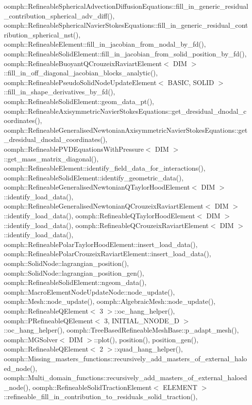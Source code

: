 oomph\+::\+Refineable\+Spherical\+Advection\+Diffusion\+Equations\+::fill\+\_\+in\+\_\+generic\+\_\+residual\+\_\+contribution\+\_\+spherical\+\_\+adv\+\_\+diff(), oomph\+::\+Refineable\+Spherical\+Navier\+Stokes\+Equations\+::fill\+\_\+in\+\_\+generic\+\_\+residual\+\_\+contribution\+\_\+spherical\+\_\+nst(), oomph\+::\+Refineable\+Element\+::fill\+\_\+in\+\_\+jacobian\+\_\+from\+\_\+nodal\+\_\+by\+\_\+fd(), oomph\+::\+Refineable\+Solid\+Element\+::fill\+\_\+in\+\_\+jacobian\+\_\+from\+\_\+solid\+\_\+position\+\_\+by\+\_\+fd(), oomph\+::\+Refineable\+Buoyant\+Q\+Crouzeix\+Raviart\+Element$<$ D\+I\+M $>$\+::fill\+\_\+in\+\_\+off\+\_\+diagonal\+\_\+jacobian\+\_\+blocks\+\_\+analytic(), oomph\+::\+Refineable\+Pseudo\+Solid\+Node\+Update\+Element$<$ B\+A\+S\+I\+C, S\+O\+L\+I\+D $>$\+::fill\+\_\+in\+\_\+shape\+\_\+derivatives\+\_\+by\+\_\+fd(), oomph\+::\+Refineable\+Solid\+Element\+::geom\+\_\+data\+\_\+pt(), oomph\+::\+Refineable\+Axisymmetric\+Navier\+Stokes\+Equations\+::get\+\_\+dresidual\+\_\+dnodal\+\_\+coordinates(), oomph\+::\+Refineable\+Generalised\+Newtonian\+Axisymmetric\+Navier\+Stokes\+Equations\+::get\+\_\+dresidual\+\_\+dnodal\+\_\+coordinates(), oomph\+::\+Refineable\+P\+V\+D\+Equations\+With\+Pressure$<$ D\+I\+M $>$\+::get\+\_\+mass\+\_\+matrix\+\_\+diagonal(), oomph\+::\+Refineable\+Element\+::identify\+\_\+field\+\_\+data\+\_\+for\+\_\+interactions(), oomph\+::\+Refineable\+Solid\+Element\+::identify\+\_\+geometric\+\_\+data(), oomph\+::\+Refineable\+Generalised\+Newtonian\+Q\+Taylor\+Hood\+Element$<$ D\+I\+M $>$\+::identify\+\_\+load\+\_\+data(), oomph\+::\+Refineable\+Generalised\+Newtonian\+Q\+Crouzeix\+Raviart\+Element$<$ D\+I\+M $>$\+::identify\+\_\+load\+\_\+data(), oomph\+::\+Refineable\+Q\+Taylor\+Hood\+Element$<$ D\+I\+M $>$\+::identify\+\_\+load\+\_\+data(), oomph\+::\+Refineable\+Q\+Crouzeix\+Raviart\+Element$<$ D\+I\+M $>$\+::identify\+\_\+load\+\_\+data(), oomph\+::\+Refineable\+Polar\+Taylor\+Hood\+Element\+::insert\+\_\+load\+\_\+data(), oomph\+::\+Refineable\+Polar\+Crouzeix\+Raviart\+Element\+::insert\+\_\+load\+\_\+data(), oomph\+::\+Solid\+Node\+::lagrangian\+\_\+position(), oomph\+::\+Solid\+Node\+::lagrangian\+\_\+position\+\_\+gen(), oomph\+::\+Refineable\+Solid\+Element\+::ngeom\+\_\+data(), oomph\+::\+Macro\+Element\+Node\+Update\+Node\+::node\+\_\+update(), oomph\+::\+Mesh\+::node\+\_\+update(), oomph\+::\+Algebraic\+Mesh\+::node\+\_\+update(), oomph\+::\+Refineable\+Q\+Element$<$ 3 $>$\+::oc\+\_\+hang\+\_\+helper(), oomph\+::\+P\+Refineable\+Q\+Element$<$ 3, I\+N\+I\+T\+I\+A\+L\+\_\+\+N\+N\+O\+D\+E\+\_\+D $>$\+::oc\+\_\+hang\+\_\+helper(), oomph\+::\+Tree\+Based\+Refineable\+Mesh\+Base\+::p\+\_\+adapt\+\_\+mesh(), oomph\+::\+M\+G\+Solver$<$ D\+I\+M $>$\+::plot(), position(), position\+\_\+gen(), oomph\+::\+Refineable\+Q\+Element$<$ 2 $>$\+::quad\+\_\+hang\+\_\+helper(), oomph\+::\+Missing\+\_\+masters\+\_\+functions\+::recursively\+\_\+add\+\_\+masters\+\_\+of\+\_\+external\+\_\+haloed\+\_\+node(), oomph\+::\+Multi\+\_\+domain\+\_\+functions\+::recursively\+\_\+add\+\_\+masters\+\_\+of\+\_\+external\+\_\+haloed\+\_\+node(), oomph\+::\+Refineable\+Solid\+Traction\+Element$<$ E\+L\+E\+M\+E\+N\+T $>$\+::refineable\+\_\+fill\+\_\+in\+\_\+contribution\+\_\+to\+\_\+residuals\+\_\+solid\+\_\+traction(), 